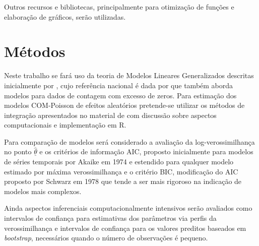 \documentclass[
12pt,				%
openright,			%
oneside,			%
a4paper,			%
english,			%
brazil,				%
]{abntex2}
\begin{document}
Outros recursos e bibliotecas, principalmente para 
otimização de funções e elaboração de gráficos, serão 
utilizadas.

\section{Métodos}
\label{sec:metodos}

Neste trabalho se fará uso da teoria de Modelos Lineares Generalizados
descritas inicialmente por , cujo referência
nacional é dada por  que também aborda modelos
para dados de contagem com excesso de zeros. Para estimação dos modelos
COM-Poisson de efeitos aleatórios pretende-se utilizar os métodos de
integração apresentados no material de  com
discussão sobre aspectos computacionais e implementação em R.

Para comparação de modelos será considerado a avaliação da
log-verossimilhança no ponto $\hat{\underline{\theta}}$ e os critérios
de informação AIC, proposto inicialmente para modelos de séries
temporais por Akaike em 1974 e estendido para qualquer modelo
estimado por máxima verossimilhança e o critério BIC, modificação do AIC
proposto por Schwarz em 1978 que tende a ser mais rigoroso na indicação
de modelos mais complexos.

Ainda aspectos inferenciais computacionalmente intensivos serão
avaliados como intervalos de confiança para estimativas dos parâmetros
via perfis da verossimilhança e intervalos de confiança para os valores
preditos baseados em \textit{bootstrap}, necessários quando o número de
observações é pequeno.
\end{document}
